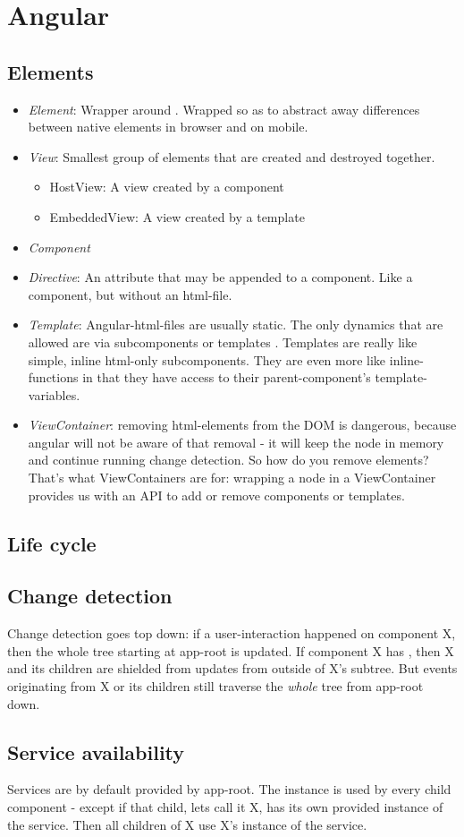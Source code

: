 \section{Angular}


\subsection{Elements}

\begin{itemize}
    \item \emph{Element}: Wrapper around . Wrapped so as to abstract away differences between native elements in browser and on mobile.
    \item \emph{View}: Smallest group of elements that are created and destroyed together.
        \begin{itemize}
            \item HostView: A view created by a component
            \item EmbeddedView: A view created by a template
        \end{itemize}
    \item \emph{Component}
    \item \emph{Directive}: An attribute that may be appended to a component. Like a component, but without an html-file.
    \item \emph{Template}: Angular-html-files are usually static. The only dynamics that are allowed are via subcomponents or templates . Templates are really like simple, inline html-only subcomponents. They are even more like inline-functions in that they have access to their parent-component's template-variables.
    \item \emph{ViewContainer}: removing html-elements from the DOM is dangerous, because angular will not be aware of that removal - it will keep the node in memory and continue running change detection. So how do you remove elements? That's what ViewContainers are for: wrapping a node in a ViewContainer provides us with an API to add or remove components or templates.
\end{itemize}

\subsection{Life cycle}

\subsection{Change detection}
Change detection goes top down: if a user-interaction happened on component X, then the whole tree starting at app-root is updated.
If component X has , then X and its children are shielded from updates from outside of X's subtree. But events originating from X or its children still traverse the \emph{whole} tree from app-root down.

\subsection{Service availability}
Services are by default provided by app-root. The instance is used by every child component - except if that child, lets call it X, has its own provided instance of the service. Then all children of X use X's instance of the service.